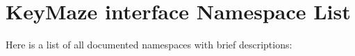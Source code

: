 \section{KeyMaze interface Namespace List}
Here is a list of all documented namespaces with brief descriptions:\begin{CompactList}
\item{}
\end{CompactList}
